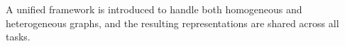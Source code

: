 A unified framework is introduced to handle both homogeneous and heterogeneous graphs, and the resulting representations are shared across all tasks.
